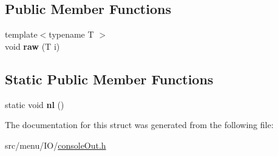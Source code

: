 \subsection*{Public Member Functions}
\begin{DoxyCompactItemize}
\item 
\mbox{\label{structConsole_ab7a075ab27e0cb666ac5abaaf0c576b1}} 
{\footnotesize template$<$typename T $>$ }\\void {\bfseries raw} (T i)
\end{DoxyCompactItemize}
\subsection*{Static Public Member Functions}
\begin{DoxyCompactItemize}
\item 
\mbox{\label{structConsole_a68249f60fcaaaf8db2b3723ea7252bb1}} 
static void {\bfseries nl} ()
\end{DoxyCompactItemize}


The documentation for this struct was generated from the following file\+:\begin{DoxyCompactItemize}
\item 
src/menu/\+I\+O/\hyperlink{consoleOut_8h}{console\+Out.\+h}\end{DoxyCompactItemize}
